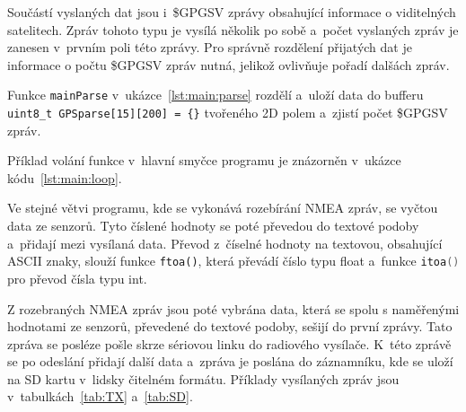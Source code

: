 \documentclass[twoside]{ctuthesis}
\theoremstyle{plain}
\theoremstyle{definition}
\theoremstyle{note}
\begin{document}
		Součástí vyslaných dat jsou i~\$GPGSV zprávy obsahující informace o viditelných satelitech. Zpráv tohoto typu je vysílá několik po sobě a~počet vyslaných zpráv je zanesen v~prvním poli této zprávy. Pro správně rozdělení přijatých dat je informace o počtu \$GPGSV zpráv nutná, jelikož ovlivňuje pořadí dalšách zpráv.

		Funkce \lstinline[language=C] |mainParse| v~ukázce~\ref{lst:main:parse} rozdělí a~uloží data do bufferu \lstinline |uint8_t GPSparse[15][200] = {}|   tvořeného 2D polem a~zjistí počet \$GPGSV zpráv.

		



		Příklad volání funkce v~hlavní smyčce programu je znázorněn v~ukázce kódu~\ref{lst:main:loop}.
		

		Ve stejné větvi programu, kde se vykonává rozebírání NMEA zpráv, se vyčtou data ze senzorů. Tyto číslené hodnoty se poté převedou do textové podoby a~přidají mezi vysílaná data. Převod z~číselné hodnoty na textovou, obsahující ASCII znaky, slouží funkce \lstinline |ftoa()|, která převádí číslo typu float a~funkce \lstinline[language=C] |itoa()| pro převod čísla typu int. 

		Z rozebraných NMEA zpráv jsou poté vybrána data, která se spolu s naměřenými hodnotami ze senzorů, převedené do textové podoby, sešijí do první zprávy. Tato zpráva se posléze pošle skrze sériovou linku do radiového vysílače. K~této zprávě se po odeslání přidají další data a~zpráva je poslána do záznamníku, kde se uloží na SD kartu v~lidsky čitelném formátu. Příklady vysílaných zpráv jsou v~tabulkách~\ref{tab:TX} a~\ref{tab:SD}.
\end{document}
